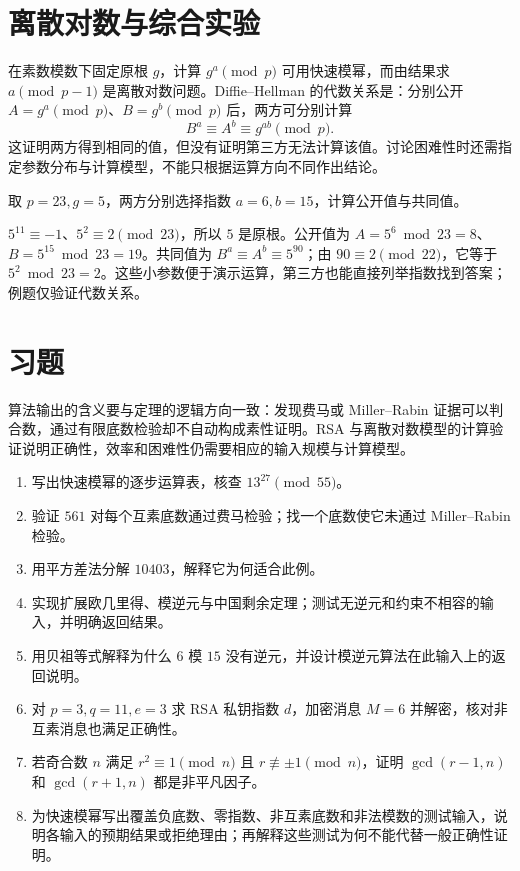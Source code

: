 \section{离散对数与综合实验}

在素数模数下固定原根 $g$，计算 $g^a\pmod p$ 可用快速模幂，而由结果求 $a\pmod{p-1}$ 是离散对数问题。Diffie--Hellman 的代数关系是：分别公开 $A=g^a\pmod p$、$B=g^b\pmod p$ 后，两方可分别计算
\[
 B^a\equiv A^b\equiv g^{ab}\pmod p.
\]
这证明两方得到相同的值，但没有证明第三方无法计算该值。讨论困难性时还需指定参数分布与计算模型，不能只根据运算方向不同作出结论。

\begin{example}[核对离散对数模型中的共同值]
取 $p=23,g=5$，两方分别选择指数 $a=6,b=15$，计算公开值与共同值。
\end{example}
\begin{solve}
$5^{11}\equiv-1$、$5^2\equiv2\pmod{23}$，所以 $5$ 是原根。公开值为 $A=5^6\bmod23=8$、$B=5^{15}\bmod23=19$。共同值为 $B^a\equiv A^b\equiv5^{90}$；由 $90\equiv2\pmod{22}$，它等于 $5^2\bmod23=2$。这些小参数便于演示运算，第三方也能直接列举指数找到答案；例题仅验证代数关系。
\end{solve}

\section{习题}

算法输出的含义要与定理的逻辑方向一致：发现费马或 Miller--Rabin 证据可以判合数，通过有限底数检验却不自动构成素性证明。RSA 与离散对数模型的计算验证说明正确性，效率和困难性仍需要相应的输入规模与计算模型。

\begin{enumerate}
 \item 写出快速模幂的逐步运算表，核查 $13^{27}\pmod{55}$。
 \item 验证 $561$ 对每个互素底数通过费马检验；找一个底数使它未通过 Miller--Rabin 检验。
 \item 用平方差法分解 $10403$，解释它为何适合此例。
 \item 实现扩展欧几里得、模逆元与中国剩余定理；测试无逆元和约束不相容的输入，并明确返回结果。
 \item\label{ex:algo-inverse-fail} 用贝祖等式解释为什么 $6$ 模 $15$ 没有逆元，并设计模逆元算法在此输入上的返回说明。
 \item\label{ex:algo-rsa-small} 对 $p=3,q=11,e=3$ 求 RSA 私钥指数 $d$，加密消息 $M=6$ 并解密，核对非互素消息也满足正确性。
 \item\label{ex:algo-sqrt-factor} 若奇合数 $n$ 满足 $r^2\equiv1\pmod n$ 且 $r\not\equiv\pm1\pmod n$，证明 $\gcd(r-1,n)$ 和 $\gcd(r+1,n)$ 都是非平凡因子。
 \item\label{ex:algo-test-cases} 为快速模幂写出覆盖负底数、零指数、非互素底数和非法模数的测试输入，说明各输入的预期结果或拒绝理由；再解释这些测试为何不能代替一般正确性证明。
\end{enumerate}

